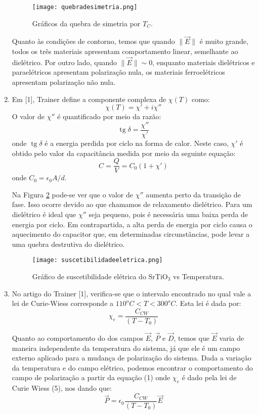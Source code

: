 \documentclass[a4paper,12pt]{article}
\DeclareMathOperator{\tg}{tg}
\newcommand{\eq}{\begin{equation}}
\newcommand{\feq}{\end{equation}}
\begin{document}
\begin{enumerate}
\begin{figure}[H] 
\centering
\texttt{[image: quebradesimetria.png]} 
\caption{Gráficos da quebra de simetria por $T_C$.} 
\label{fig4} 
\end{figure}

Quanto às condições de contorno, temos que quando $\lVert\vec{E}\rVert$ é muito grande, todos os três materiais apresentam comportamento linear, semelhante ao dielétrico. Por outro lado, quando $\lVert\vec{E}\rVert\sim 0$, enquanto materiais dielétricos e paraelétricos apresentam polarização nula, os materiais ferroelétricos apresentam polarização não nula.

\item Em [1], Trainer define a componente complexa de $\chi (T)$ como:
\eq\chi (T) = \chi' + i\chi''\feq
O valor de $\chi''$ é quantificado por meio da razão:
\eq\tg\delta = \dfrac{\chi''}{\chi'}\feq
onde $\tg{\delta}$ é a energia perdida por ciclo na forma de calor. Neste caso, $\chi'$ é obtido pelo valor da capacitância medida por meio da seguinte equação:
\eq C = \dfrac{Q}{V} = C_0(1+\chi')\feq
onde $C_0 = \epsilon_0A/d$.

Na Figura \ref{fig5} pode-se ver que o valor de $\chi''$ aumenta perto da transição de fase. Isso ocorre devido ao que chamamos de relaxamento dielétrico. Para um dielétrico é ideal que $\chi''$ seja pequeno, pois é necessária uma baixa perda de energia por ciclo. Em contrapartida, a alta perda de energia por ciclo causa o aquecimento do capacitor que, em determinadas circunstâncias, pode levar a uma quebra destrutiva do dielétrico.

\begin{figure}[H] 
\centering
\texttt{[image: suscetibilidadeeletrica.png]} 
\caption{Gráfico de suscetibilidade elétrica do SrTiO$_3$ vs Temperatura.} 
\label{fig5} 
\end{figure}

\item 
No artigo do Trainer [1], verifica-se que o intervalo encontrado no qual vale a lei de Curie-Wiess corresponde a $110^oC<T<300^oC$. Esta lei é dada por:
\eq\chi_e = \dfrac{C_{CW}}{\left( T-T_0 \right)}\feq

Quanto ao comportamento do dos campos $\vec{E}$, $\vec{P}$ e $\vec{D}$, temos que $\vec{E}$ varia de maneira independente da temperatura do sistema, já que ele é um campo externo aplicado para a mudança de polarização do sistema. Dada a variação da temperatura e do campo elétrico, podemos encontrar o comportamento do campo de polarização a partir da equação (1) onde $\chi_e$ é dado pela lei de Curie Wiess (5), nos dando que:
\eq\vec{P} = \epsilon_0 \dfrac{C_{CW}}{\left( T-T_0 \right)} \vec{E}\feq


\end{enumerate}
\end{document}
